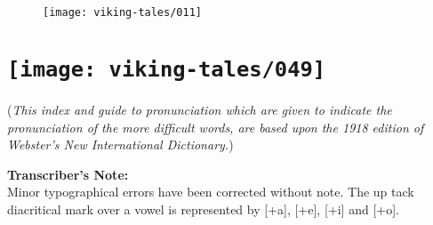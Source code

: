 \begin{figure}[hb]
    \centering
    \vskip8pt
    \texttt{[image: viking-tales/011]}
\end{figure}

\chapter[A Pronouncing Index]{
    \texttt{[image: viking-tales/049]}}

(\emph{This index and guide to pronunciation which are given to indicate
the pronunciation of the more difficult words, are based upon the 1918
edition of Webster's New International Dictionary.})

\noindent\textbf{Transcriber's Note:}\\
Minor typographical errors have been corrected without note. The up tack
diacritical mark over a vowel is represented by [+a], [+e], [+i] and
[+o].

